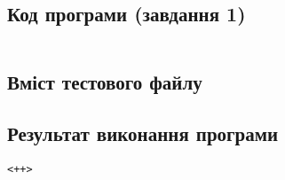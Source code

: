 \subsection*{Код програми (завдання 1)}

\inputminted{c++}{<++>}

\subsection*{Вміст тестового файлу}



\subsection*{Результат виконання програми}



\begin{verbatim}
<++>
\end{verbatim}
